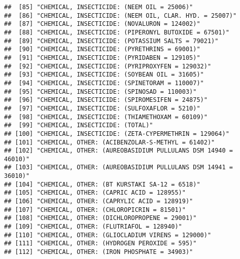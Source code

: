 \documentclass[
]{article}
\begin{document}
\begin{verbatim}
##  [85] "CHEMICAL, INSECTICIDE: (NEEM OIL = 25006)"                                         
##  [86] "CHEMICAL, INSECTICIDE: (NEEM OIL, CLAR. HYD. = 25007)"                             
##  [87] "CHEMICAL, INSECTICIDE: (NOVALURON = 124002)"                                       
##  [88] "CHEMICAL, INSECTICIDE: (PIPERONYL BUTOXIDE = 67501)"                               
##  [89] "CHEMICAL, INSECTICIDE: (POTASSIUM SALTS = 79021)"                                  
##  [90] "CHEMICAL, INSECTICIDE: (PYRETHRINS = 69001)"                                       
##  [91] "CHEMICAL, INSECTICIDE: (PYRIDABEN = 129105)"                                       
##  [92] "CHEMICAL, INSECTICIDE: (PYRIPROXYFEN = 129032)"                                    
##  [93] "CHEMICAL, INSECTICIDE: (SOYBEAN OIL = 31605)"                                      
##  [94] "CHEMICAL, INSECTICIDE: (SPINETORAM = 110007)"                                      
##  [95] "CHEMICAL, INSECTICIDE: (SPINOSAD = 110003)"                                        
##  [96] "CHEMICAL, INSECTICIDE: (SPIROMESIFEN = 24875)"                                     
##  [97] "CHEMICAL, INSECTICIDE: (SULFOXAFLOR = 5210)"                                       
##  [98] "CHEMICAL, INSECTICIDE: (THIAMETHOXAM = 60109)"                                     
##  [99] "CHEMICAL, INSECTICIDE: (TOTAL)"                                                    
## [100] "CHEMICAL, INSECTICIDE: (ZETA-CYPERMETHRIN = 129064)"                               
## [101] "CHEMICAL, OTHER: (ACIBENZOLAR-S-METHYL = 61402)"                                   
## [102] "CHEMICAL, OTHER: (AUREOBASIDIUM PULLULANS DSM 14940 = 46010)"                      
## [103] "CHEMICAL, OTHER: (AUREOBASIDIUM PULLULANS DSM 14941 = 36010)"                      
## [104] "CHEMICAL, OTHER: (BT KURSTAKI SA-12 = 6518)"                                       
## [105] "CHEMICAL, OTHER: (CAPRIC ACID = 128955)"                                           
## [106] "CHEMICAL, OTHER: (CAPRYLIC ACID = 128919)"                                         
## [107] "CHEMICAL, OTHER: (CHLOROPICRIN = 81501)"                                           
## [108] "CHEMICAL, OTHER: (DICHLOROPROPENE = 29001)"                                        
## [109] "CHEMICAL, OTHER: (FLUTRIAFOL = 128940)"                                            
## [110] "CHEMICAL, OTHER: (GLIOCLADIUM VIRENS = 129000)"                                    
## [111] "CHEMICAL, OTHER: (HYDROGEN PEROXIDE = 595)"                                        
## [112] "CHEMICAL, OTHER: (IRON PHOSPHATE = 34903)"                                         

\end{verbatim}
\end{document}

